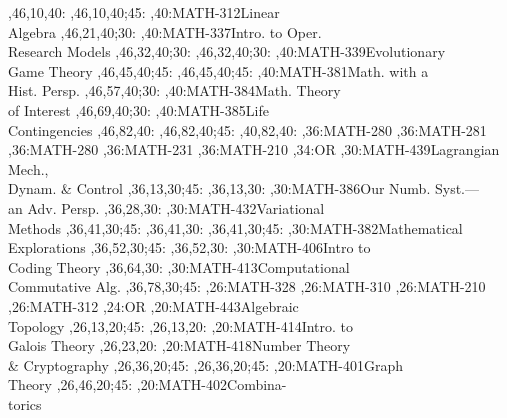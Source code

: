 \documentclass[9pt]{extarticle}
\begin{document}
\begin{chart}
  ,46,10,40:
  ,46,10,40;45:
,40:{MATH-312}{Linear\\Algebra}{}
  ,46,21,40;30:
,40:{MATH-337}{Intro. to Oper.\\Research Models}{}
  ,46,32,40;30:
  ,46,32,40;30:
,40:{MATH-339}{Evolutionary\\Game Theory}{}
  ,46,45,40;45:
  ,46,45,40;45:
,40:{MATH-381}{Math. with a\\Hist. Persp.}{}
  ,46,57,40;30:
,40:{MATH-384}{Math. Theory\\of Interest}{}
  ,46,69,40;30:
,40:{MATH-385}{Life\\Contingencies}{}
  ,46,82,40:
  ,46,82,40;45:
  ,40,82,40:
,36:{MATH-280}
,36:{MATH-281}
,36:{MATH-280}
,36:{MATH-231}
,36:{MATH-210}
,34:{OR}
,30:{MATH-439}{Lagrangian Mech.,\\Dynam. \& Control}{}
  ,36,13,30;45:
  ,36,13,30:
,30:{MATH-386}{Our Numb. Syst.---\\an Adv. Persp.}{}
  ,36,28,30:
,30:{MATH-432}{Variational\\Methods}{}
  ,36,41,30;45:
  ,36,41,30:
  ,36,41,30;45:
,30:{MATH-382}{Mathematical\\Explorations}{}
  ,36,52,30;45:
  ,36,52,30:
,30:{MATH-406}{Intro to\\Coding Theory}{}
  ,36,64,30:
,30:{MATH-413}{Computational\\Commutative Alg.}{}
  ,36,78,30;45:
,26:{MATH-328}
,26:{MATH-310}
,26:{MATH-210}
,26:{MATH-312}
,24:{OR}
,20:{MATH-443}{Algebraic\\Topology}{}
  ,26,13,20;45:
  ,26,13,20:
,20:{MATH-414}{Intro. to\\Galois Theory}{}
  ,26,23,20:
,20:{MATH-418}{Number Theory\\\& Cryptography}{}
  ,26,36,20;45:
  ,26,36,20;45:
,20:{MATH-401}{Graph\\Theory}{}
  ,26,46,20;45:
,20:{MATH-402}{Combina-\\torics}{}

\end{chart}
\end{document}

